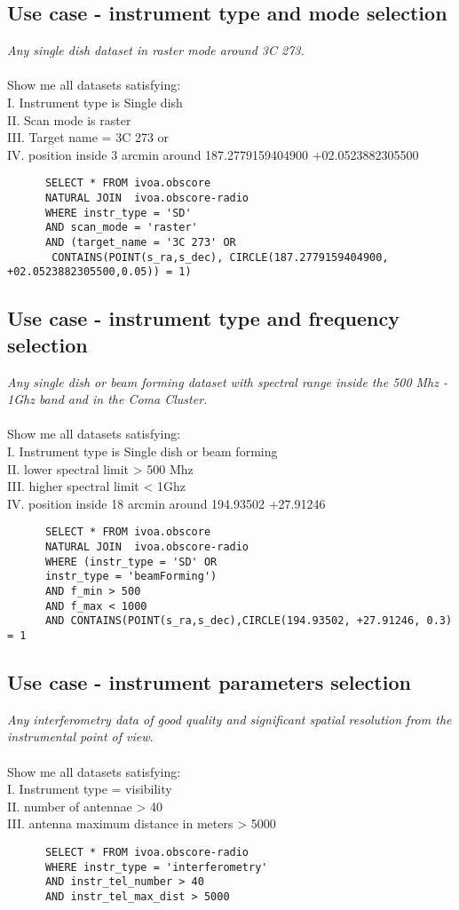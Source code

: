 \subsection{Use case -  instrument type and mode selection }
\label{sec:instrument-mode}
\textit{Any single dish  dataset  in raster mode around 3C 273.}\\ \\
Show me all datasets satisfying:\\
I. Instrument type is Single dish \\
II. Scan mode is raster \\
III. Target name = 3C 273 or \\
IV. position inside 3 arcmin around  	187.2779159404900 +02.0523882305500
\begin{verbatim}
      SELECT * FROM ivoa.obscore 
      NATURAL JOIN  ivoa.obscore-radio
      WHERE instr_type = 'SD' 
      AND scan_mode = 'raster' 
      AND (target_name = '3C 273' OR
       CONTAINS(POINT(s_ra,s_dec), CIRCLE(187.2779159404900, +02.0523882305500,0.05)) = 1)     
\end{verbatim}

\subsection{Use case - instrument type and frequency selection }
\textit{Any single dish or beam forming dataset  with spectral range inside the 500 Mhz - 1Ghz band and in the Coma Cluster.}\\ \\
Show me all datasets satisfying:\\
I. Instrument type is Single dish or beam forming \\
II. lower spectral limit > 500 Mhz \\
III. higher spectral limit < 1Ghz \\
IV. position inside 18 arcmin around 194.93502 +27.91246

\begin{verbatim}
      SELECT * FROM ivoa.obscore 
      NATURAL JOIN  ivoa.obscore-radio
      WHERE (instr_type = 'SD' OR
      instr_type = 'beamForming') 
      AND f_min > 500 
      AND f_max < 1000 
      AND CONTAINS(POINT(s_ra,s_dec),CIRCLE(194.93502, +27.91246, 0.3) = 1     
\end{verbatim}


\subsection{Use case - instrument parameters selection }
\textit{Any interferometry data of good quality and significant spatial resolution from the instrumental point of view. }\\ \\
Show me all datasets satisfying:\\
I. Instrument type = visibility \\
II. number of antennae > 40 \\
III. antenna maximum distance in meters  > 5000 \\

\begin{verbatim}
      SELECT * FROM ivoa.obscore-radio
      WHERE instr_type = 'interferometry' 
      AND instr_tel_number > 40 
      AND instr_tel_max_dist > 5000 
\end{verbatim}



